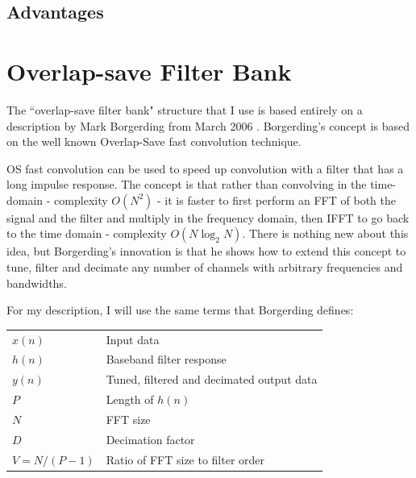 \documentclass[12pt]{report}
\begin{document}
\subsection{Advantages}
\label{sec:poly_advantages}

\section{Overlap-save Filter Bank}
\label{sec:filter_bank}
The ``overlap-save filter bank" structure that I use is based entirely on
a description by Mark Borgerding from March 2006 \cite{Borgerding1}.
Borgerding's concept is based on the well known Overlap-Save fast convolution
technique.

OS fast convolution can be used to speed up convolution with
a filter that has a long impulse response. The concept is that rather than
convolving in the time-domain - complexity $O(N^2)$ - it is faster to first
perform an FFT of both the signal and the filter and multiply in the frequency
domain, then IFFT to go back to the time domain - complexity $O(N\log_2N)$.
There is nothing new about this idea, but Borgerding's innovation is that he
shows how to extend this concept to tune, filter and decimate any number of
channels with arbitrary frequencies and bandwidths.

For my description, I will use the same terms that Borgerding defines:

\begin{tabular}{ll}
    $x(n)$        & Input data \\
    $h(n)$        & Baseband filter response \\
    $y(n)$        & Tuned, filtered and decimated output data \\
    $P$           & Length of $h(n)$ \\
    $N$           & FFT size \\
    $D$           & Decimation factor \\
    $V = N/(P-1)$ & Ratio of FFT size to filter order \\
\end{tabular}
\end{document}
